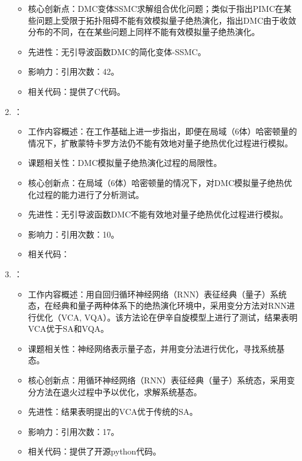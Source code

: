 \begin{enumerate}
\begin{itemize}
                \item 核心创新点：DMC变体SSMC求解组合优化问题；类似于\citet{hastings2013obstructions}指出PIMC在某些问题上受限于拓扑阻碍不能有效模拟量子绝热演化，指出DMC由于收敛分布的不同，在在某些问题上同样不能有效模拟量子绝热演化。
                \item 先进性：无引导波函数DMC的简化变体-SSMC。
                \item 影响力：引用次数：42。
                \item 相关代码：提供了C代码。
            \end{itemize}
            \item \citet{bringewatt2018diffusion}：
            \begin{itemize}
                \item 工作内容概述：在\citet{jarret2016adiabatic}工作基础上进一步指出，即便在局域（6体）哈密顿量的情况下，扩散蒙特卡罗方法仍不能有效地对量子绝热优化过程进行模拟。
                \item 课题相关性：DMC模拟量子绝热演化过程的局限性。
                \item 核心创新点：在局域（6体）哈密顿量的情况下，对DMC模拟量子绝热优化过程的能力进行了分析测试。
                \item 先进性：无引导波函数DMC不能有效地对量子绝热优化过程进行模拟。
                \item 影响力：引用次数：10。
                \item 相关代码：
            \end{itemize}
            \item \citet{hibat2021variational}：
            \begin{itemize}
                \item 工作内容概述：用自回归循环神经网络（RNN）表征经典（量子）系统态，在经典和量子两种体系下的绝热演化环境中，采用变分方法对RNN进行优化（VCA, VQA）。该方法论在伊辛自旋模型上进行了测试，结果表明VCA优于SA和VQA。
                \item 课题相关性：神经网络表示量子态，并用变分法进行优化，寻找系统基态。
                \item 核心创新点：用循环神经网络（RNN）表征经典（量子）系统态，采用变分方法在退火过程中予以优化，求解系统基态。
                \item 先进性：结果表明提出的VCA优于传统的SA。
                \item 影响力：引用次数：17。
                \item 相关代码：提供了开源python代码。
            \end{itemize}


\end{enumerate}

